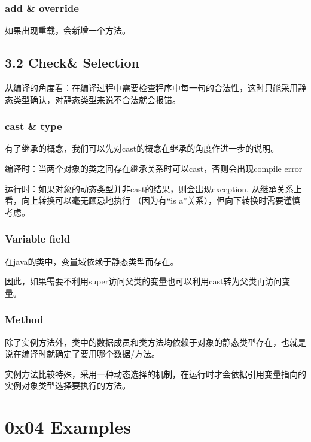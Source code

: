\subsubsection{add \& override}

\textbf{\color{red}{变量中不存在覆盖的概念，如果变量出现重名，会新增一个变量。}}

如果出现重载，会新增一个方法。

\subsection{3.2 Check\& Selection}

从编译的角度看：在编译过程中需要检查程序中每一句的合法性，这时只能采用静态类型确认，对静态类型来说不合法就会报错。

\subsubsection{cast \& type}

有了继承的概念，我们可以先对cast的概念在继承的角度作进一步的说明。

编译时：当两个对象的类之间存在继承关系时可以cast，否则会出现compile error

运行时：如果对象的动态类型并非cast的结果，则会出现exception. 从继承关系上看，向上转换可以毫无顾忌地执行
（因为有“is a”关系），但向下转换时需要谨慎考虑。

\subsubsection{Variable field}

在java的类中，变量域依赖于静态类型而存在。

因此，如果需要不利用super访问父类的变量也可以利用cast转为父类再访问变量。

\subsubsection{Method}

除了实例方法外，类中的数据成员和类方法均依赖于对象的静态类型存在，也就是说在编译时就确定了要用哪个数据/方法。

实例方法比较特殊，采用一种动态选择的机制，在运行时才会依据引用变量指向的实例对象类型选择要执行的方法。

\section{0x04 Examples}

